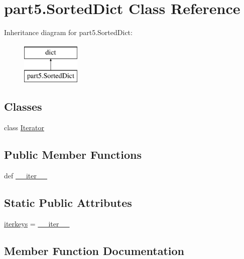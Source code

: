 \hypertarget{classpart5_1_1SortedDict}{}\section{part5.\+Sorted\+Dict Class Reference}
\label{classpart5_1_1SortedDict}
Inheritance diagram for part5.\+Sorted\+Dict\+:\begin{figure}[H]
\begin{center}
\leavevmode
\includegraphics[height=2.000000cm]{classpart5_1_1SortedDict}
\end{center}
\end{figure}
\subsection*{Classes}
\begin{DoxyCompactItemize}
\item 
class \hyperlink{classpart5_1_1SortedDict_1_1Iterator}{Iterator}
\end{DoxyCompactItemize}
\subsection*{Public Member Functions}
\begin{DoxyCompactItemize}
\item 
def \hyperlink{classpart5_1_1SortedDict_affdd3d8e3a3b945a7563e2f4201b5154}{\+\_\+\+\_\+iter\+\_\+\+\_\+}
\end{DoxyCompactItemize}
\subsection*{Static Public Attributes}
\begin{DoxyCompactItemize}
\item 
\hyperlink{classpart5_1_1SortedDict_abf047e8382979900a3262428fa044644}{iterkeys} = \hyperlink{classpart5_1_1SortedDict_affdd3d8e3a3b945a7563e2f4201b5154}{\+\_\+\+\_\+iter\+\_\+\+\_\+}
\end{DoxyCompactItemize}


\subsection{Member Function Documentation}
\hypertarget{classpart5_1_1SortedDict_affdd3d8e3a3b945a7563e2f4201b5154}{}
